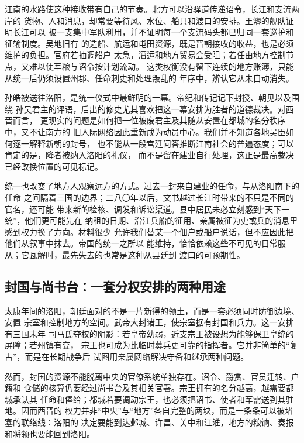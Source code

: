 江南的水路使这种接收带有自己的节奏。北方可以沿驿道传递诏令，长江和支流两岸的
货物、人和消息，却常要等待风、水位、船只和渡口的安排。王濬的舰队证明长江可以
被一支集中军队利用，并不证明每一个支流码头都已归同一套巡护和征输制度。吴地旧有
的造船、航运和屯田资源，既是晋朝接收的收益，也是必须维护的负担。官府若抽调船户
太急，漕运和地方贸易会受阻；若任由地方控制节点，又难以使军粮与诏令按计划流动。
这类权衡没有留下连续的地方账簿，只能从统一后仍须设置州郡、任命刺史和处理叛乱的
年序中，辨认它从未自动消失。

孙皓被送往洛阳，是统一仪式中最鲜明的一幕。帝纪和传记记下封授、朝见以及围绕
孙吴君主的评语，后出的修史尤其喜欢把这一幕安排为胜者的道德裁决。对西晋而言，
更现实的问题是如何把一位被废君主及其随从安置在都城的名分秩序中，又不让南方的
旧人际网络因此重新成为动员中心。我们并不知道各地吴臣如何逐一解释新朝的封号，
也不能从一段宫廷问答推断江南社会的普遍态度；可以肯定的是，降者被纳入洛阳的礼仪，
而不是留在建业自行处理，这正是最高裁决已经改换位置的可见标记。

统一也改变了地方人观察远方的方式。过去一封来自建业的任命，与从洛阳南下的任命
之间隔着三国的边界；二八〇年以后，文书越过长江时带来的不只是不同的官名，还可能
带来新的检核、调发和诉讼渠道。县中居民未必立刻感到“天下一统”，他们更可能先在
纳租的日期、沿江兵船的征用、亲属被征为吏或兵的消息里感到权力换了方向。材料很少
允许我们替某一个佃户或船户说话，但不应因此把他们从叙事中抹去。帝国的统一之所以
能维持，恰恰依赖这些不可见的日常服从；它瓦解时，最先失去的也常是这种从县廷到
渡口的可预期性。

\subsection{封国与尚书台：一套分权安排的两种用途}

太康年间的洛阳，朝廷面对的不是一片新得的领土，而是一套必须同时防御边境、安置
宗室和控制地方的空间。武帝大封诸王，使宗室据有封国和兵力。这一安排有三国末年
司马氏夺权的阴影：若皇帝幼弱，近支宗王被设想为能够保卫皇统的屏障；若州镇有变，
宗王也可成为比临时募兵更可靠的指挥者。它并非简单的“复古”，而是在长期战争后
试图用亲属网络解决守备和继承两种问题。

然而，封国的资源不能脱离中央的官僚系统单独存在。诏令、爵赏、官员迁转、户籍和
仓储的核算仍要经过尚书台及其相关官署。宗王拥有的名分越高，越需要都城承认其
任命和俸给；都城若要调动宗王，也必须把诏书、使者和军需送到其驻地。因而西晋的
权力并非“中央”与“地方”各自完整的两块，而是一条条可以被堵塞的联络线：洛阳的
决定要能到达邺城、许昌、关中和江淮，地方的粮饷、奏报和将领也要能回到洛阳。

